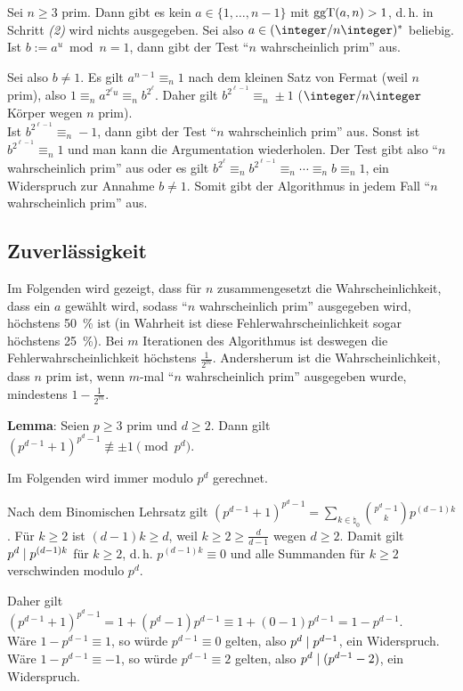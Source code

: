 \begin{Beweis}
    Sei $n \ge 3$ prim.
    Dann gibt es kein $a \in \{1, \dotsc, n - 1\}$ mit $\operatorname{ggT}(a, n) > 1$, d.\,h.
    in Schritt \emph{(2)} wird nichts ausgegeben.
    Sei also $a \in (\ZnZ)^\ast$ beliebig.
    Ist $b := a^u \bmod n = 1$, dann gibt der Test "`$n$ wahrscheinlich prim"' aus.
    
    Sei also $b \not= 1$.
    Es gilt $a^{n-1} \equiv_n 1$ nach dem kleinen Satz von Fermat (weil $n$ prim),
    also $1 \equiv_n a^{2^\ell u} \equiv_n b^{2^\ell}$.
    Daher gilt $b^{2^{\ell-1}} \equiv_n \pm 1$
    ($\ZnZ$ Körper wegen $n$ prim).\\
    Ist $b^{2^{\ell-1}} \equiv_n -1$, dann gibt der Test "`$n$ wahrscheinlich prim"' aus.
    Sonst ist $b^{2^{\ell-1}} \equiv_n 1$ und man kann die Argumentation wiederholen.
    Der Test gibt also "`$n$ wahrscheinlich prim"' aus oder es gilt
    $b^{2^\ell} \equiv_n b^{2^{\ell-1}} \equiv_n \dotsb \equiv_n b \equiv_n 1$,
    ein Widerspruch zur Annahme $b \not= 1$.
    Somit gibt der Algorithmus in jedem Fall "`$n$ wahrscheinlich prim"' aus.
\end{Beweis}

\subsection{%
    Zuverlässigkeit%
}

Im Folgenden wird gezeigt, dass für $n$ zusammengesetzt die Wahrscheinlichkeit,
dass ein $a$ gewählt wird, sodass "`$n$ wahrscheinlich prim"' ausgegeben wird,
höchstens \SI{50}{\percent} ist
(in Wahrheit ist diese Fehlerwahrscheinlichkeit sogar höchstens \SI{25}{\percent}).
Bei $m$ Iterationen des Algorithmus ist deswegen die Fehlerwahrscheinlichkeit
höchstens $\frac{1}{2^m}$.
Andersherum ist die Wahrscheinlichkeit, dass $n$ prim ist, wenn $m$-mal
"`$n$ wahrscheinlich prim"' ausgegeben wurde, mindestens $1 - \frac{1}{2^m}$.

\linie

\textbf{Lemma}:
Seien $p \ge 3$ prim und $d \ge 2$.
Dann gilt $(p^{d-1} + 1)^{p^d-1} \not\equiv \pm 1 \pmod{p^d}$.

\begin{Beweis}
    Im Folgenden wird immer modulo $p^d$ gerechnet.
    
    Nach dem Binomischen Lehrsatz gilt
    $(p^{d-1} + 1)^{p^d-1} = \sum_{k \in \natural_0} \binom{p^d - 1}{k} p^{(d-1)k}$.
    Für $k \ge 2$ ist $(d-1)k \ge d$, weil $k \ge 2 \ge \frac{d}{d-1}$ wegen $d \ge 2$.
    Damit gilt $p^d \mid p^{(d-1)k}$ für $k \ge 2$, d.\,h. $p^{(d-1)k} \equiv 0$ und
    alle Summanden für $k \ge 2$ verschwinden modulo $p^d$.
    
    Daher gilt
    $(p^{d-1} + 1)^{p^d-1} = 1 + (p^d - 1) p^{d-1} \equiv
    1 + (0 - 1)p^{d-1} = 1 - p^{d-1}$.\\
    Wäre $1 - p^{d-1} \equiv 1$, so würde $p^{d-1} \equiv 0$ gelten,
    also $p^d \mid p^{d-1}$, ein Widerspruch.\\
    Wäre $1 - p^{d-1} \equiv -1$, so würde $p^{d-1} \equiv 2$ gelten,
    also $p^d \mid (p^{d-1}-2)$,
    ein Widerspruch.
\end{Beweis}

